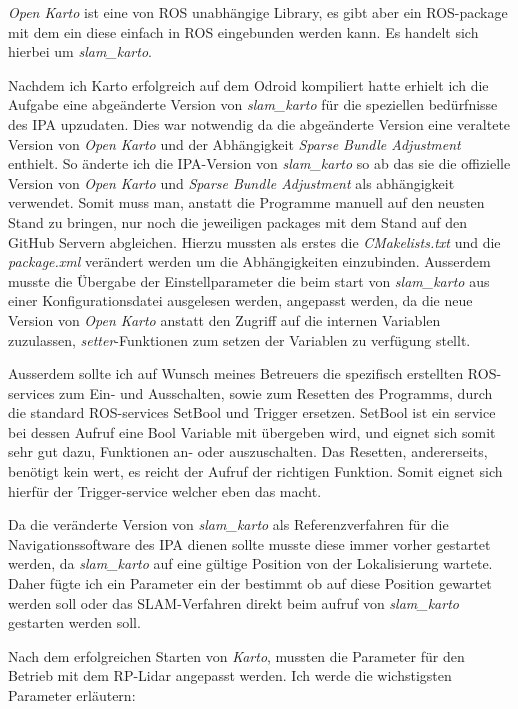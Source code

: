 \emph{Open Karto} ist eine von ROS unabhängige Library, es gibt aber ein ROS-\Gls{package} mit dem ein diese einfach in ROS eingebunden werden kann. Es handelt sich hierbei um \emph{slam\_karto}.

Nachdem ich Karto erfolgreich auf dem Odroid kompiliert hatte erhielt ich die Aufgabe eine abgeänderte Version von \emph{slam\_karto} für die speziellen bedürfnisse des IPA upzudaten. Dies war notwendig da die abgeänderte Version eine veraltete Version von \emph{Open Karto} und der Abhängigkeit \emph{Sparse Bundle Adjustment} enthielt. 
So änderte ich die IPA-Version von \emph{slam\_karto} so ab das sie die offizielle Version von \emph{Open Karto} und \emph{Sparse Bundle Adjustment} als abhängigkeit verwendet. Somit muss man, anstatt die Programme manuell auf den neusten Stand zu bringen, nur noch die jeweiligen \Glspl{package} mit dem Stand auf den GitHub Servern abgleichen. Hierzu mussten als erstes die \emph{CMakelists.txt} und die \emph{package.xml} verändert werden um die Abhängigkeiten einzubinden. Ausserdem musste die Übergabe der Einstellparameter die beim start von \emph{slam\_karto} aus einer Konfigurationsdatei ausgelesen werden, angepasst werden, da die neue Version von \emph{Open Karto} anstatt den Zugriff auf die internen Variablen zuzulassen, \emph{setter}-Funktionen zum setzen der Variablen zu verfügung stellt.

Ausserdem sollte ich auf Wunsch meines Betreuers die spezifisch erstellten ROS-\Glspl{service} zum Ein- und Ausschalten, sowie zum Resetten des Programms, durch die standard ROS-\Glspl{service} SetBool und Trigger ersetzen. SetBool ist ein \Gls{service} bei dessen Aufruf eine Bool Variable mit übergeben wird, und eignet sich somit sehr gut dazu, Funktionen an- oder auszuschalten. Das Resetten, andererseits, benötigt kein wert, es reicht der Aufruf der richtigen Funktion. Somit eignet sich hierfür der Trigger-\Gls{service} welcher eben das macht.

Da die veränderte Version von \emph{slam\_karto} als Referenzverfahren für die Navigationssoftware des IPA dienen sollte musste diese immer vorher gestartet werden, da \emph{slam\_karto} auf eine gültige Position von der Lokalisierung wartete. 
Daher fügte ich ein Parameter ein der bestimmt ob auf diese Position gewartet werden soll oder das SLAM-Verfahren direkt beim aufruf von \emph{slam\_karto} gestarten werden soll.

Nach dem erfolgreichen Starten von \emph{Karto}, mussten die Parameter für den Betrieb mit dem RP-Lidar angepasst werden. Ich werde die wichstigsten Parameter erläutern:

